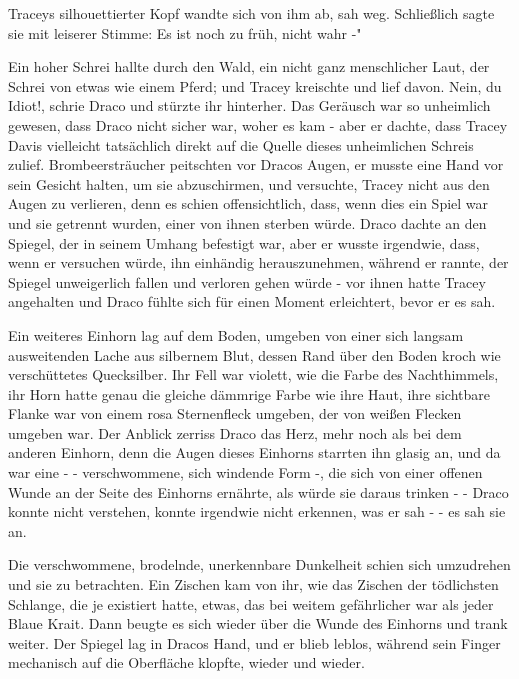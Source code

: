 Traceys silhouettierter Kopf wandte sich von ihm ab, sah weg. Schließlich sagte
sie mit leiserer Stimme: \glqq Es ist noch zu früh, nicht wahr -"

Ein hoher Schrei hallte durch den Wald, ein nicht ganz menschlicher Laut, der
Schrei von etwas wie einem Pferd; und Tracey kreischte und lief davon.
\glqq Nein, du Idiot!\grqq{}, schrie Draco und stürzte ihr hinterher. Das
Geräusch war so unheimlich gewesen, dass Draco nicht sicher war, woher es
kam - aber er dachte, dass Tracey Davis vielleicht tatsächlich direkt auf
die Quelle dieses unheimlichen Schreis zulief. Brombeersträucher
peitschten vor Dracos Augen, er musste eine Hand vor sein Gesicht halten,
um sie abzuschirmen, und versuchte, Tracey nicht aus den Augen zu
verlieren, denn es schien offensichtlich, dass, wenn dies ein Spiel war
und sie getrennt wurden, einer von ihnen sterben würde. Draco dachte an
den Spiegel, der in seinem Umhang befestigt war, aber er wusste
irgendwie, dass, wenn er versuchen würde, ihn einhändig herauszunehmen,
während er rannte, der Spiegel unweigerlich fallen und verloren gehen
würde - vor ihnen hatte Tracey angehalten und Draco fühlte sich für einen
Moment erleichtert, bevor er es sah.

Ein weiteres Einhorn lag auf dem Boden, umgeben von einer sich langsam
ausweitenden Lache aus silbernem Blut, dessen Rand über den Boden kroch
wie verschüttetes Quecksilber. Ihr Fell war violett, wie die Farbe des
Nachthimmels, ihr Horn hatte genau die gleiche dämmrige Farbe wie ihre
Haut, ihre sichtbare Flanke war von einem rosa Sternenfleck umgeben, der
von weißen Flecken umgeben war. Der Anblick zerriss Draco das Herz, mehr
noch als bei dem anderen Einhorn, denn die Augen dieses Einhorns starrten
ihn glasig an, und da war eine - - verschwommene, sich windende Form -,
die sich von einer offenen Wunde an der Seite des Einhorns ernährte, als
würde sie daraus trinken - - Draco konnte nicht verstehen, konnte
irgendwie nicht erkennen, was er sah - - es sah sie an.

Die verschwommene, brodelnde, unerkennbare Dunkelheit schien sich umzudrehen und
sie zu betrachten. Ein Zischen kam von ihr, wie das Zischen der
tödlichsten Schlange, die je existiert hatte, etwas, das bei weitem
gefährlicher war als jeder Blaue Krait. Dann beugte es sich wieder über
die Wunde des Einhorns und trank weiter. Der Spiegel lag in Dracos Hand,
und er blieb leblos, während sein Finger mechanisch auf die Oberfläche
klopfte, wieder und wieder.

